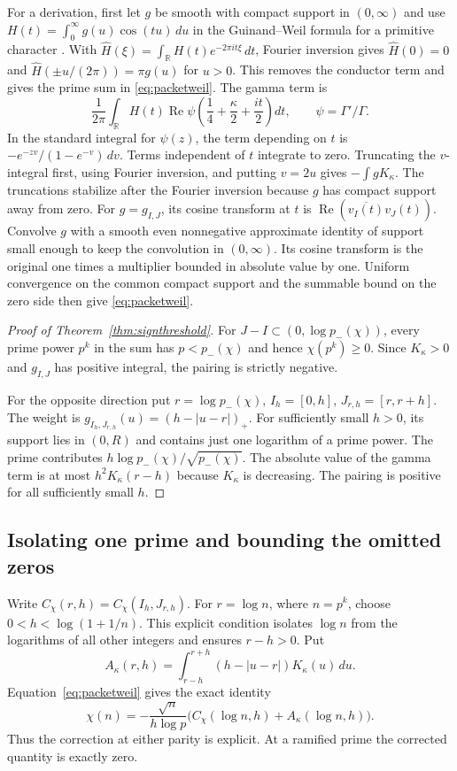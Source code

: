 \documentclass[11pt,letterpaper]{article}
\theoremstyle{remark}\newtheorem{remark}[theorem]{Remark}
\begin{document}
For a derivation, first let $g$ be smooth with compact support in
$(0,\infty)$ and use $H(t)=\int_0^\infty g(u)\cos(tu)\,du$ in
the Guinand--Weil formula for a primitive character \cite[eq.~(2.1)]{weilref}.
With $\widehat H(\xi)=\int_{\mathbb R}H(t)e^{-2\pi i t\xi}\,dt$,
Fourier inversion gives $\widehat H(0)=0$ and
$\widehat H(\pm u/(2\pi))=\pi g(u)$ for $u>0$.
This removes the conductor term and gives the prime sum in
\eqref{eq:packetweil}. The gamma term is
\[
 \frac{1}{2\pi}\int_{\mathbb R}H(t)\operatorname{Re}\psi
       \left(\frac14+\frac\kappa2+\frac{it}{2}\right)dt,
 \qquad \psi=\Gamma'/\Gamma.
\]
In the standard integral for $\psi(z)$, the term depending on $t$ is
$-e^{-zv}/(1-e^{-v})\,dv$. Terms independent of $t$ integrate to zero.
Truncating the $v$-integral first, using Fourier inversion, and putting
$v=2u$ gives $-\int gK_\kappa$. The truncations stabilize after the
Fourier inversion because $g$ has compact support away from zero.
For $g=g_{I,J}$, its cosine transform at $t$ is
$\operatorname{Re}(\overline{v_I(t)}v_J(t))$. Convolve $g$ with a smooth
even nonnegative approximate identity of support small enough to keep the
convolution in $(0,\infty)$. Its cosine transform is the original one
times a multiplier bounded in absolute value by one. Uniform convergence
on the common compact support and the summable bound on the zero side
then give \eqref{eq:packetweil}.

\begin{proof}[Proof of Theorem~\ref{thm:signthreshold}]
For $J-I\subset(0,\log p_-(\chi))$, every prime power $p^k$
in the sum has $p<p_-(\chi)$ and hence $\chi(p^k)\ge0$. Since
$K_\kappa>0$ and $g_{I,J}$ has positive integral, the pairing is strictly
negative.

For the opposite direction put $r=\log p_-(\chi)$,
$I_h=[0,h]$, $J_{r,h}=[r,r+h]$. The weight is
$g_{I_h,J_{r,h}}(u)=(h-|u-r|)_+$.
For sufficiently small $h>0$, its support lies in $(0,R)$ and contains
just one logarithm of a prime power. The prime contributes
$h\log p_-(\chi)/\sqrt{p_-(\chi)}$. The absolute value of the gamma
term is at most $h^2K_\kappa(r-h)$ because $K_\kappa$ is decreasing.
The pairing is positive for all sufficiently small $h$.
\end{proof}

\subsection*{Isolating one prime and bounding the omitted zeros}

Write $C_\chi(r,h)=C_\chi(I_h,J_{r,h})$. For $r=\log n$, where
$n=p^k$, choose $0<h<\log(1+1/n)$. This explicit condition isolates
$\log n$ from the logarithms of all other integers and ensures $r-h>0$.
Put
\[
 A_\kappa(r,h)=\int_{r-h}^{r+h}(h-|u-r|)K_\kappa(u)\,du.
\]
Equation~\eqref{eq:packetweil} gives the exact identity
\begin{equation}\label{eq:packetrecover}
 \chi(n)=-\frac{\sqrt n}{h\log p}
       \bigl(C_\chi(\log n,h)+A_\kappa(\log n,h)\bigr).
\end{equation}
Thus the correction at either parity is explicit. At a ramified prime the
corrected quantity is exactly zero.
\end{document}
